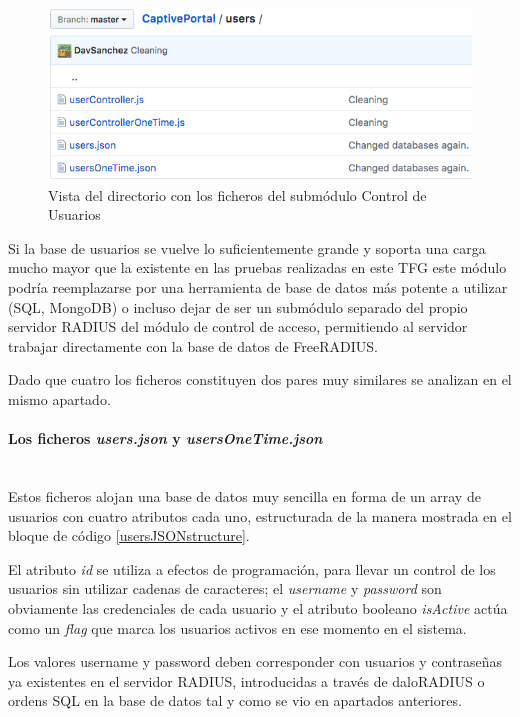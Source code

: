 \begin{figure}[!t]
\begin{center}
\includegraphics[width=0.75\linewidth]{./5_AnalisisOrganico/Img/usersDir.png}
\end{center}
\caption{Vista del directorio con los ficheros del submódulo Control de Usuarios}
\label{usersDir}
\end{figure}

Si la base de usuarios se vuelve lo suficientemente grande y soporta una carga mucho mayor que la existente en las pruebas realizadas en este TFG este módulo podría reemplazarse por una herramienta de base de datos más potente a utilizar (SQL, MongoDB) o incluso dejar de ser un submódulo separado del propio servidor RADIUS del módulo de control de acceso, permitiendo al servidor trabajar directamente con la base de datos de FreeRADIUS.

Dado que cuatro los ficheros constituyen dos pares muy similares se analizan en el mismo apartado.

\paragraph{Los ficheros \emph{users.json} y \emph{usersOneTime.json}} \label{usersJSONFiles} ~\\

Estos ficheros alojan una base de datos muy sencilla en forma de un array de usuarios con cuatro atributos cada uno, estructurada de la manera mostrada en el bloque de código \ref{usersJSONstructure}.

El atributo \emph{id} se utiliza a efectos de programación, para llevar un control de los usuarios sin utilizar cadenas de caracteres; el \emph{username} y \emph{password} son obviamente las credenciales de cada usuario y el atributo booleano \emph{isActive} actúa como un \emph{flag} que marca los usuarios activos en ese momento en el sistema.

Los valores username y password deben corresponder con usuarios y contraseñas ya existentes en el servidor RADIUS, introducidas a través de daloRADIUS o ordens SQL en la base de datos tal y como se vio en apartados anteriores.

